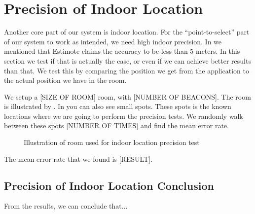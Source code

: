 \section{Precision of Indoor Location}\label{sec:estimoteprecision}
Another core part of our system is indoor location. 
For the ``point-to-select'' part of our system to work as intended, we need high indoor precision. 
In  we mentioned that Estimote claims the accuracy to be less than \num{5} meters.
In this section we test if that is actually the case, or even if we can achieve better results than that. 
We test this by comparing the position we get from the application to the actual position we have in the room. 

We setup a [SIZE OF ROOM] room, with [NUMBER OF BEACONS]. 
The room is illustrated by . 
In  you can also see small spots. 
These spots is the known locations where we are going to perform the precision tests. 
We randomly walk between these spots [NUMBER OF TIMES] and find the mean error rate.
\begin{figure}[!htb]
    \centering
    \caption{Illustration of room used for indoor location precision test}
    \label{fig:precisiontest}
\end{figure}

The mean error rate that we found is [RESULT]. 

\subsection{Precision of Indoor Location Conclusion}
From the results, we can conclude that... 

